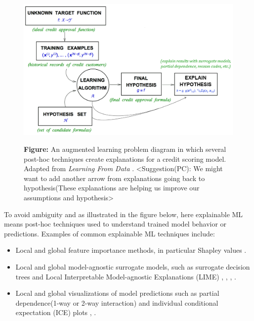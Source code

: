 \documentclass{article}
\begin{document}
\begin{figure}[htb]
	\begin{center}
		\includegraphics[scale=0.33]{img/figure_1.png}
		\label{fig:learning_problem}
		\captionsetup{labelformat=empty}
		\caption{\textbf{Figure:} An augmented learning problem diagram in which several post-hoc techniques create explanations for a credit scoring model. Adapted from \textit{Learning From Data} \cite{lfd}. <Suggestion(PC): We might want to add another 
		arrow from explanations going back to hypothesis(These explanations are helping us improve our assumptions and hypothesis>} 
	\end{center}
\end{figure}	

To avoid ambiguity and as illustrated in the figure below, here explainable ML means post-hoc techniques used to understand trained model behavior or predictions. Examples of common explainable ML techniques include:

\begin{itemize}
\item Local and global feature importance methods, in particular Shapley values \cite{shapley1988shapley} \cite{keinan2004fair} \cite{kononenko2010efficient} \cite{shapley}.
\item Local and global model-agnostic surrogate models, such as surrogate decision trees and Local Interpretable Model-agnostic Explanations (LIME) \cite{dt_surrogate1}, \cite{dt_surrogate2}, \cite{lime-sup}, \cite{lime}. 
\item Local and global visualizations of model predictions such as partial dependence(1-way or 2-way interaction) and individual conditional expectation (ICE) plots \cite{esl}, \cite{ice_plots}.
\end{itemize}
\end{document}
